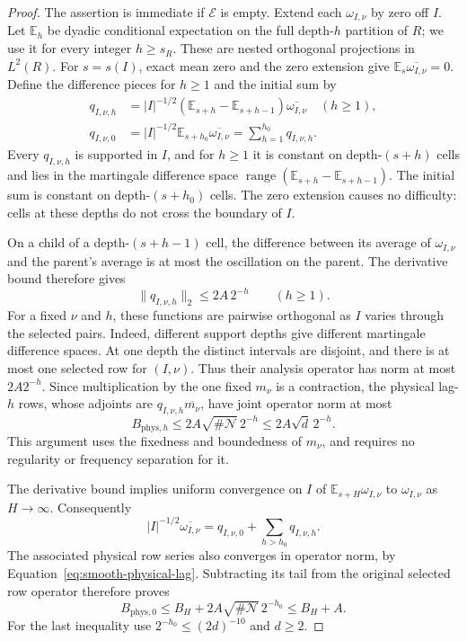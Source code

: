 \begin{proof}
The assertion is immediate if $\mathcal E$ is empty.  Extend each
$\omega_{I,\nu}$ by zero off $I$.  Let $\mathbb E_h$ be dyadic
conditional expectation on the full depth-$h$ partition of $R$;
we use it for every integer $h\ge s_R$.  These are nested orthogonal
projections in $L^2(R)$.  For $s=s(I)$, exact mean zero and the zero
extension give $\mathbb E_s\overline{\omega_{I,\nu}}=0$.  Define the
difference pieces for $h\ge1$ and the initial sum by
\[
 \begin{aligned}
 q_{I,\nu,h}
 &=|I|^{-1/2}(\mathbb E_{s+h}-\mathbb E_{s+h-1})
                         \overline{\omega_{I,\nu}}\quad(h\ge1),\\
 q_{I,\nu,0}
 &=|I|^{-1/2}\mathbb E_{s+h_0}\overline{\omega_{I,\nu}}
 =\sum_{h=1}^{h_0}q_{I,\nu,h}.
 \end{aligned}
\]
Every $q_{I,\nu,h}$ is supported in $I$, and for $h\ge1$ it
is constant on depth-$(s+h)$ cells and lies in the martingale
difference space
$\operatorname{range}(\mathbb E_{s+h}-\mathbb E_{s+h-1})$.
The initial sum is constant on depth-$(s+h_0)$ cells.
The zero extension causes no difficulty: cells at these depths
do not cross the boundary of $I$.

On a child of a depth-$(s+h-1)$ cell, the difference between
its average of $\omega_{I,\nu}$ and the parent's average is
at most the oscillation on the parent.  The derivative bound
therefore gives
\begin{equation}
 \|q_{I,\nu,h}\|_2\le 2A\,2^{-h}\qquad(h\ge1).
 \label{eq:smooth-difference-size}
\end{equation}
For a fixed $\nu$ and $h$, these functions are pairwise
orthogonal as $I$ varies through the selected pairs.  Indeed,
different support depths give different martingale difference
spaces.  At one depth the distinct intervals are disjoint,
and there is at most one selected row for $(I,\nu)$.
Thus their analysis operator has norm at most $2A2^{-h}$.
Since multiplication by the one fixed $m_\nu$ is a contraction,
the physical lag-$h$ rows, whose adjoints are
$q_{I,\nu,h}\overline{m_\nu}$, have joint operator norm at most
\begin{equation}
 B_{\mathrm{phys},h}\le 2A\sqrt{\#\mathcal N}\,2^{-h}
 \le 2A\sqrt d\,2^{-h}.
 \label{eq:smooth-physical-lag}
\end{equation}
This argument uses the fixedness and boundedness of $m_\nu$,
and requires no regularity or frequency separation for it.

The derivative bound implies uniform convergence on $I$
of $\mathbb E_{s+H}\omega_{I,\nu}$ to $\omega_{I,\nu}$ as
$H\to\infty$.  Consequently
\[
 |I|^{-1/2}\overline{\omega_{I,\nu}}
 =q_{I,\nu,0}+\sum_{h>h_0}q_{I,\nu,h}.
\]
The associated physical row series also converges in operator norm,
by Equation~\eqref{eq:smooth-physical-lag}.
Subtracting its tail from the original selected row operator
therefore proves
\[
 B_{\mathrm{phys},0}
 \le B_H+2A\sqrt{\#\mathcal N}\,2^{-h_0}
 \le B_H+A.
\]
For the last inequality use
$2^{-h_0}\le(2d)^{-10}$ and $d\ge2$.


\end{proof}

